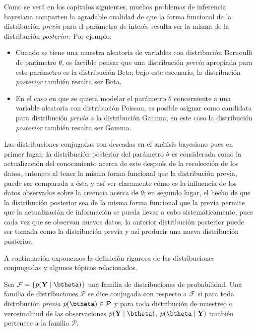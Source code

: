 Como se verá en los capítulos siguientes, muchos problemas de inferencia bayesiana comparten la agradable cualidad de que la forma funcional de la distribución \emph{previa} para el parámetro de interés resulta ser la misma de la distribución \emph{posterior}. Por ejemplo:

\begin{itemize}
  \item Cuando se tiene una muestra aleatoria de variables con distribución Bernoulli de parámetro $\theta$, es factible pensar que una distribución \emph{previa} apropiada para este parámetro es la distribución Beta; bajo este escenario, la distribución \emph{posterior} también resulta ser Beta.
  \item En el caso en que se quiera modelar el parámetro $\theta$ concerniente a una variable aleatoria con distribución Poisson, es posible asignar como candidata para distribución \emph{previa} a la distribución Gamma; en este caso la distribución \emph{posterior} también resulta ser Gamma.
\end{itemize}

Las distribuciones conjugadas son deseadas en el análisis bayesiano pues en primer lugar, la distribución posterior del parámetro $\theta$ es considerada como la actualización del conocimiento acerca de este después de la recolección de los datos, entonces al tener la misma forma funcional que la distribución previa, puede ser comparada a ésta y así ver claramente cómo es la influencia de los datos observados sobre la creencia acerca de $\theta$; en segundo lugar, el hecho de que la distribución posterior sea de la misma forma funcional que la previa permite que la actualización de información se pueda llevar a cabo sistemáticamente, pues cada vez que se observan nuevos datos, la anterior distribución posterior puede ser tomada como la distribución previa y así producir una nueva distribución posterior. 

A continuación exponemos la definición rigurosa de las distribuciones conjungadas y algunos tópicos relacionados.

\begin{Defi}
Sea $\mathcal{F}=\{p(\mathbf{Y} \mid \btheta)\}$ una familia de distribuciones de probabilidad. Una familia de distribuciones $\mathcal{P}$ se dice conjugada con respecto a $\mathcal{F}$ si para toda distribución \emph{previa} $p(\btheta) \in \mathcal{P}$ y para toda distribución de muestreo o verosimilitud de las observaciones $p(\mathbf{Y} \mid \btheta)$, $p(\btheta \mid \mathbf{Y})$ también pertenece a la familia $\mathcal{P}$.
\end{Defi}

